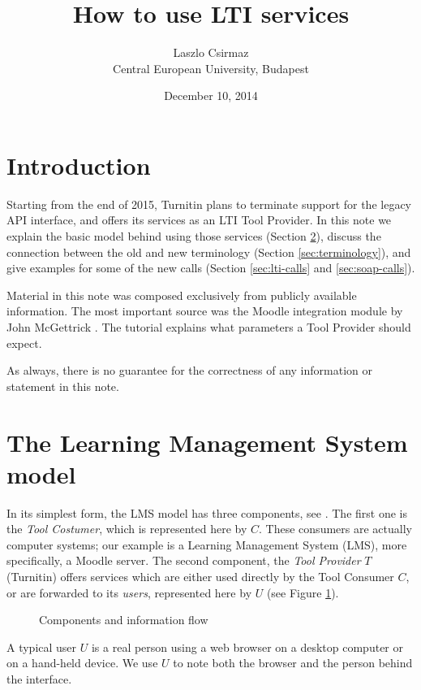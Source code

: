 \documentclass{article}
\begin{document}
\title{How to use LTI services}
\author{Laszlo Csirmaz\\\small Central European University, Budapest}
\date{December 10, 2014}
\maketitle
\section{Introduction}\label{sec:intro}
Starting from the end of 2015, Turnitin plans to terminate support for the
legacy API interface, and offers its services as an LTI Tool Provider. In this
note we explain the basic model behind using those services (Section
\ref{sec:model}), discuss the connection between the old and new terminology
(Section \ref{sec:terminology}), and give examples for some
of the new calls (Section \ref{sec:lti-calls} and \ref{sec:soap-calls}). 

Material in this note was composed exclusively from publicly available 
information. The most important source was the Moodle integration module
by John McGettrick \cite{moodlev2}. The tutorial \cite{tutorial} explains
what parameters a Tool Provider should expect.

As always, there is no guarantee for 
the correctness of any information or statement in this note.

\section{The Learning Management System model}\label{sec:model}
In its simplest form, the LMS model has three components, see \cite{lti2}.
The first one is the {\it Tool Costumer}, which is represented here by $C$.
These consumers are actually computer systems; our example is a
Learning Management System (LMS), more specifically, a Moodle server.
The second component, the {\it Tool Provider}
$T$ (Turnitin) offers services which are either used directly by the Tool Consumer $C$, or
are forwarded to its {\it users}, represented here by $U$
(see Figure \ref{fig:model}).
\begin{figure}[h!bt]
\begin{center}\end{center} \kern -14pt
\caption{Components and information flow}\label{fig:model}
\end{figure}
A typical user $U$ is a real person using a web browser
on a desktop computer or on a hand-held device. We use $U$ to note both
the browser and the person behind the interface.
\end{document}
